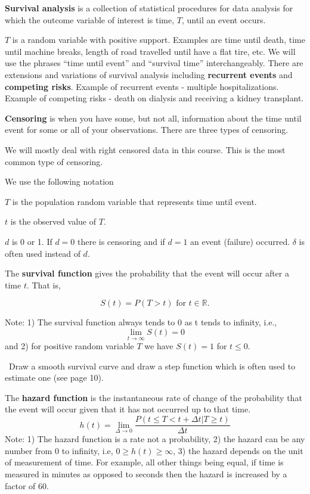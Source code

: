 \documentclass{article}
\begin{document}

 \textbf{Survival analysis} is a collection of statistical procedures for data analysis for which the outcome variable of interest is time, $T$, until an event occurs.

\bn
\im $T$ is a random variable with positive support. Examples are time until death, time until machine breaks, length of road travelled until have a flat tire, etc. We will use the phrases ``time until event'' and ``survival time'' interchangeably.
\im There are extensions and variations of survival analysis including \textbf{recurrent events} and \textbf{competing risks}.
\im Example of recurrent events - multiple hospitalizations. Example of competing risks - death on dialysis and receiving a kidney transplant.
\en

 \textbf{Censoring} is when you have some, but not all, information about the time until event for some or all of your observations. There are three types of censoring.

We will mostly deal with right censored data in this course. This is the most common type of censoring.


 We use the following notation
\bn
\item $T$ is the population random variable that represents time until event.
\item $t$ is the observed value of $T$.
\item $d$ is 0 or 1. If $d=0$ there is censoring and if $d=1$ an event (failure) occurred. $\delta$ is often used instead of $d$.
\en

 The \textbf{survival function} gives the probability that the event will occur after a time $t$. That is,

\[
S(t) = P(T>t) \text{ for } t \in \mathbb{R}.
\]

Note: 1) The survival function always tends to 0 as t tends to infinity, i.e.,
\[
\lim_{t\rightarrow\infty} S(t) = 0
\]
and 2) for positive random variable $T$ we have $S(t) = 1$ for $t \le 0$.

\NTS \, Draw a smooth survival curve and draw a step function which is often used to estimate one (see page 10).

 The \textbf{hazard function} is the instantaneous rate of change of the probability that the event will occur given that it has not occurred up to that time.
\[
h(t) = \lim_{\Delta \rightarrow 0} \frac{P(t \le T < t + \Delta t | T \ge t)}{\Delta t}
\]
Note: 1) The hazard function is a rate not a probability, 2) the hazard can be any number from 0 to infinity, i.e, $0\ge h(t) \ge \infty$, 3) the hazard depends on the unit of measurement of time. For example, all other things being equal, if time is measured in minutes as opposed to seconds then the hazard is increased by a factor of 60.
\end{document}
